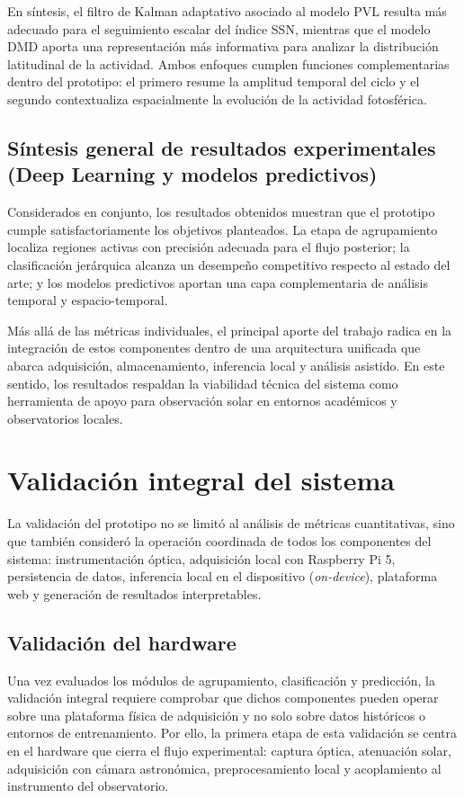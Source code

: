 En síntesis, el filtro de Kalman adaptativo asociado al modelo PVL resulta más adecuado para el seguimiento escalar del índice SSN, mientras que el modelo DMD aporta una representación más informativa para analizar la distribución latitudinal de la actividad. Ambos enfoques cumplen funciones complementarias dentro del prototipo: el primero resume la amplitud temporal del ciclo y el segundo contextualiza espacialmente la evolución de la actividad fotosférica.

\subsection{Síntesis general de resultados experimentales (Deep Learning y modelos predictivos)}

Considerados en conjunto, los resultados obtenidos muestran que el prototipo
cumple satisfactoriamente los objetivos planteados. La etapa de agrupamiento
localiza regiones activas con precisión adecuada para el flujo posterior; la
clasificación jerárquica alcanza un desempeño competitivo respecto al estado
del arte; y los modelos predictivos aportan una capa complementaria de análisis
temporal y espacio-temporal.

Más allá de las métricas individuales, el principal aporte del trabajo radica en
la integración de estos componentes dentro de una arquitectura unificada que
abarca adquisición, almacenamiento, inferencia local y análisis asistido. En este
sentido, los resultados respaldan la viabilidad técnica del sistema como
herramienta de apoyo para observación solar en entornos académicos y
observatorios locales.

\section{Validación integral del sistema}

La validación del prototipo no se limitó al análisis de métricas cuantitativas,
sino que también consideró la operación coordinada de todos los componentes del
sistema: instrumentación óptica, adquisición local con Raspberry Pi 5,
persistencia de datos, inferencia local en el dispositivo (\textit{on-device}), plataforma web y generación
de resultados interpretables.

\subsection{Validación del hardware}

Una vez evaluados los módulos de agrupamiento, clasificación y predicción, la
validación integral requiere comprobar que dichos componentes pueden operar sobre
una plataforma física de adquisición y no solo sobre datos históricos o entornos
de entrenamiento. Por ello, la primera etapa de esta validación se centra en el
hardware que cierra el flujo experimental: captura óptica, atenuación solar,
adquisición con cámara astronómica, preprocesamiento local y acoplamiento al
instrumento del observatorio.

